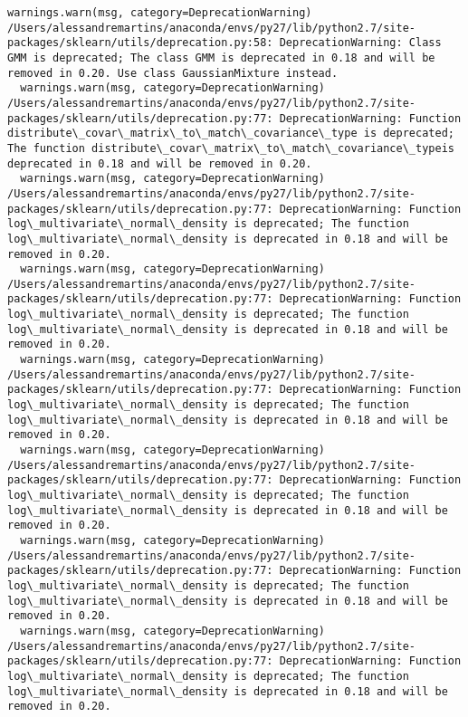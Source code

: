 \documentclass[11pt]{article}
\begin{document}
\begin{Verbatim}[commandchars=\\\{\}]
  warnings.warn(msg, category=DeprecationWarning)
/Users/alessandremartins/anaconda/envs/py27/lib/python2.7/site-packages/sklearn/utils/deprecation.py:58: DeprecationWarning: Class GMM is deprecated; The class GMM is deprecated in 0.18 and will be  removed in 0.20. Use class GaussianMixture instead.
  warnings.warn(msg, category=DeprecationWarning)
/Users/alessandremartins/anaconda/envs/py27/lib/python2.7/site-packages/sklearn/utils/deprecation.py:77: DeprecationWarning: Function distribute\_covar\_matrix\_to\_match\_covariance\_type is deprecated; The function distribute\_covar\_matrix\_to\_match\_covariance\_typeis deprecated in 0.18 and will be removed in 0.20.
  warnings.warn(msg, category=DeprecationWarning)
/Users/alessandremartins/anaconda/envs/py27/lib/python2.7/site-packages/sklearn/utils/deprecation.py:77: DeprecationWarning: Function log\_multivariate\_normal\_density is deprecated; The function log\_multivariate\_normal\_density is deprecated in 0.18 and will be removed in 0.20.
  warnings.warn(msg, category=DeprecationWarning)
/Users/alessandremartins/anaconda/envs/py27/lib/python2.7/site-packages/sklearn/utils/deprecation.py:77: DeprecationWarning: Function log\_multivariate\_normal\_density is deprecated; The function log\_multivariate\_normal\_density is deprecated in 0.18 and will be removed in 0.20.
  warnings.warn(msg, category=DeprecationWarning)
/Users/alessandremartins/anaconda/envs/py27/lib/python2.7/site-packages/sklearn/utils/deprecation.py:77: DeprecationWarning: Function log\_multivariate\_normal\_density is deprecated; The function log\_multivariate\_normal\_density is deprecated in 0.18 and will be removed in 0.20.
  warnings.warn(msg, category=DeprecationWarning)
/Users/alessandremartins/anaconda/envs/py27/lib/python2.7/site-packages/sklearn/utils/deprecation.py:77: DeprecationWarning: Function log\_multivariate\_normal\_density is deprecated; The function log\_multivariate\_normal\_density is deprecated in 0.18 and will be removed in 0.20.
  warnings.warn(msg, category=DeprecationWarning)
/Users/alessandremartins/anaconda/envs/py27/lib/python2.7/site-packages/sklearn/utils/deprecation.py:77: DeprecationWarning: Function log\_multivariate\_normal\_density is deprecated; The function log\_multivariate\_normal\_density is deprecated in 0.18 and will be removed in 0.20.
  warnings.warn(msg, category=DeprecationWarning)
/Users/alessandremartins/anaconda/envs/py27/lib/python2.7/site-packages/sklearn/utils/deprecation.py:77: DeprecationWarning: Function log\_multivariate\_normal\_density is deprecated; The function log\_multivariate\_normal\_density is deprecated in 0.18 and will be removed in 0.20.

\end{Verbatim}
\end{document}
